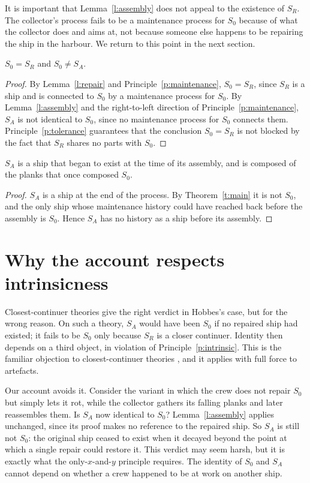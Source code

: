 \documentclass{situationist-preprint}
\begin{document}
It is important that Lemma~\ref{l:assembly} does not appeal to the existence of $S_R$. The collector's process fails to be a maintenance process for $S_0$ because of what the collector does and aims at, not because someone else happens to be repairing the ship in the harbour. We return to this point in the next section.

\begin{theorem}\label{t:main}
$S_0 = S_R$ and $S_0 \neq S_A$.
\end{theorem}

\begin{proof}
By Lemma~\ref{l:repair} and Principle~\ref{p:maintenance}, $S_0 = S_R$, since $S_R$ is a ship and is connected to $S_0$ by a maintenance process for $S_0$. By Lemma~\ref{l:assembly} and the right-to-left direction of Principle~\ref{p:maintenance}, $S_A$ is not identical to $S_0$, since no maintenance process for $S_0$ connects them. Principle~\ref{p:tolerance} guarantees that the conclusion $S_0 = S_R$ is not blocked by the fact that $S_R$ shares no parts with $S_0$.
\end{proof}

\begin{corollary}\label{c:new}
$S_A$ is a ship that began to exist at the time of its assembly, and is composed of the planks that once composed $S_0$.
\end{corollary}

\begin{proof}
$S_A$ is a ship at the end of the process. By Theorem~\ref{t:main} it is not $S_0$, and the only ship whose maintenance history could have reached back before the assembly is $S_0$. Hence $S_A$ has no history as a ship before its assembly.
\end{proof}

\section{Why the account respects intrinsicness}

Closest-continuer theories give the right verdict in Hobbes's case, but for the wrong reason. On such a theory, $S_A$ would have been $S_0$ if no repaired ship had existed; it fails to be $S_0$ only because $S_R$ is a closer continuer. Identity then depends on a third object, in violation of Principle~\ref{p:intrinsic}. This is the familiar objection to closest-continuer theories \citep{Noonan1985}, and it applies with full force to artefacts.

Our account avoids it. Consider the variant in which the crew does not repair $S_0$ but simply lets it rot, while the collector gathers its falling planks and later reassembles them. Is $S_A$ now identical to $S_0$? Lemma~\ref{l:assembly} applies unchanged, since its proof makes no reference to the repaired ship. So $S_A$ is still not $S_0$: the original ship ceased to exist when it decayed beyond the point at which a single repair could restore it. This verdict may seem harsh, but it is exactly what the only-$x$-and-$y$ principle requires. The identity of $S_0$ and $S_A$ cannot depend on whether a crew happened to be at work on another ship.
\end{document}
